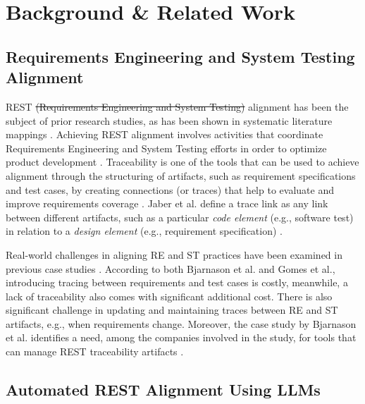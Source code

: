 \documentclass[conference]{IEEEtran}
\begin{document}
\section{Background \& Related Work}\label{background}

\subsection{Requirements Engineering and System Testing Alignment}

REST \st{(Requirements Engineering and System Testing)} alignment has been the subject of prior research studies, as has been shown in systematic literature mappings \cite{barmi2011Alignment, karhaapa2017What}. Achieving REST alignment involves activities that coordinate Requirements Engineering and System Testing efforts in order to optimize product development \cite{unterkalmsteiner2014Taxonomy}. Traceability is one of the tools that can be used to achieve alignment through the structuring of artifacts, such as requirement specifications and test cases, by creating connections (or traces) that help to evaluate and improve requirements coverage \cite{bjarnason2014Challenges}. Jaber et al. define a trace link as any link between different artifacts, such as a particular \textit{code element} (e.g., software test) in relation to a \textit{design element} (e.g., requirement specification) \cite{jaber2013Effect}. 

Real-world challenges in aligning RE and ST practices have been examined in previous case studies \cite{bjarnason2014Challenges,gomes2017Challenges}. According to both Bjarnason et al. and Gomes et al., introducing tracing between requirements and test cases is costly, meanwhile, a lack of traceability also comes with significant additional cost. There is also significant challenge in updating and maintaining traces between RE and ST artifacts, e.g., when requirements change. Moreover, the case study by Bjarnason et al. identifies a need, among the companies involved in the study, for tools that can manage REST traceability artifacts \cite{bjarnason2014Challenges}.

\subsection{Automated REST Alignment Using LLMs} 
\end{document}
